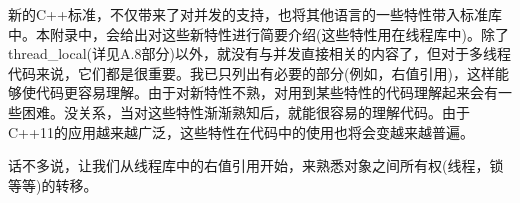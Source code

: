 
新的C++标准，不仅带来了对并发的支持，也将其他语言的一些特性带入标准库中。本附录中，会给出对这些新特性进行简要介绍(这些特性用在线程库中)。除了thread\_local(详见A.8部分)以外，就没有与并发直接相关的内容了，但对于多线程代码来说，它们都是很重要。我已只列出有必要的部分(例如，右值引用)，这样能够使代码更容易理解。由于对新特性不熟，对用到某些特性的代码理解起来会有一些困难。没关系，当对这些特性渐渐熟知后，就能很容易的理解代码。由于C++11的应用越来越广泛，这些特性在代码中的使用也将会变越来越普遍。

话不多说，让我们从线程库中的右值引用开始，来熟悉对象之间所有权(线程，锁等等)的转移。